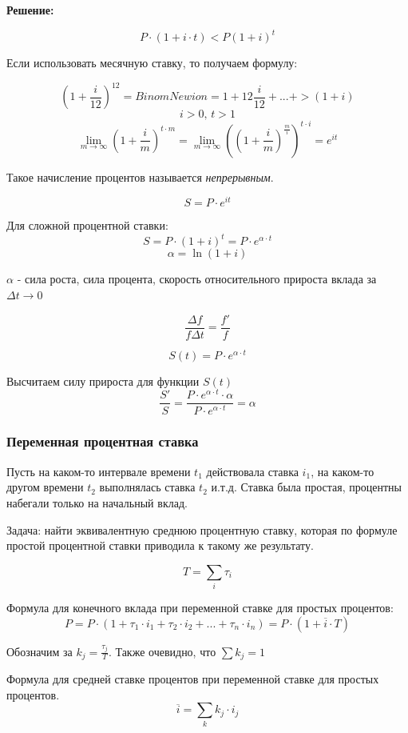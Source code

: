 \documentclass[aps,%
12pt,%
final,%
oneside,
onecolumn,%
musixtex, %
superscriptaddress,%
centertags]{article} %
\begin{document}
\textbf{Решение:}

$$ P \cdot (1+i \cdot t) < P (1+i)^t $$

Если использовать месячную ставку, то получаем формулу:

$$(1+\frac{i}{12})^{12} = {Binom Newion} = 1 + 12 \frac{i}{12} + ... + > (1+i) $$
$$ i>0 \text{, } t > 1 $$
$$ \lim_{m\to \infty} (1+\frac{i}{m})^{t\cdot m} = \lim_{m\to \infty} ((1+\frac{i}{m})^{\frac{m}{i}})^{t\cdot i} = e^{it} $$

Такое начисление процентов называется \textit{непрерывным}.

$$ S = P \cdot e^{it} $$

Для сложной процентной ставки:
$$ S = P \cdot (1+i)^t = P \cdot e^{\alpha \cdot t} $$
$$ \alpha = \ln (1+i) $$

$\alpha$ - сила роста, сила процента, скорость относительного прироста вклада за $\Delta t \rightarrow 0$

$$ \frac{\Delta f}{f \Delta t} = \frac{f'}{f} $$

$$S(t) = P \cdot e^{\alpha \cdot t}$$

Высчитаем силу прироста для функции $S(t)$
$$ \frac{S'}{S} = \frac{P \cdot e^{\alpha \cdot t} \cdot \alpha}{P \cdot e^{\alpha \cdot t}} = \alpha $$

\subsubsection{Переменная процентная ставка}

Пусть на каком-то интервале времени $t_1$ действовала ставка $i_1$, на каком-то другом времени $t_2$ выполнялась ставка $t_2$ и.т.д. Ставка была простая, процентны набегали только на начальный вклад.

Задача: найти эквивалентную среднюю процентную ставку, которая по формуле простой процентной ставки приводила к такому же результату. 

\begin{center}
\end{center}
$$ T =  \sum_{i}{\tau_i} $$

Формула для конечного вклада при переменной ставке для простых процентов:
$$ P = P \cdot (1+\tau_1 \cdot i_1 + \tau_2 \cdot i_2 + ... + \tau_n \cdot i_n) = P \cdot (1+ \overline{i}\cdot T) $$

Обозначим за $ k_j = \frac{\tau_j}{T}$. Также очевидно, что $\sum k_j = 1$

Формула для средней ставке процентов при переменной ставке для простых процентов.
$$ \overline{i} = \sum_{k}{k_j\cdot i_j} $$
\end{document}
